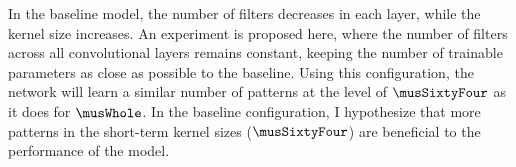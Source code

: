 
In the baseline model, the number of filters decreases in
each layer, while the kernel size increases. An experiment
is proposed here, where the number of filters across all
convolutional layers remains constant, keeping the number of
trainable parameters as close as possible to the baseline.
Using this configuration, the network will learn a similar
number of patterns at the level of $\musSixtyFour$ as it
does for $\musWhole$. In the baseline configuration, I
hypothesize that more patterns in the short-term kernel
sizes ($\musSixtyFour$) are beneficial to the performance of
the model.

